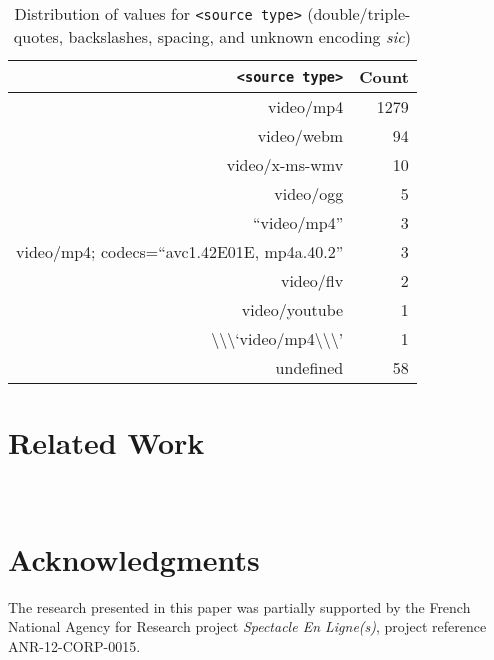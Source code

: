 \documentclass{sig-alternate}
\begin{document}
\begin{table}[p]
  \centering
  \begin{tabular}{ r | r }
    \texttt{<source type>} & Count \\
    \hline
    video/mp4 & 1279\\
    video/webm & 94\\
    video/x-ms-wmv & 10\\    
    video/ogg & 5\\    
    ``video/mp4'' & 3\\    
    video/mp4; codecs=``avc1.42E01E, mp4a.40.2'' & 3\\
    video/flv & 2\\
    video/youtube & 1\\    
    \textbackslash\textbackslash\textbackslash`video/mp4\textbackslash\textbackslash\textbackslash' & 1\\
    undefined & 58\\  
  \end{tabular}
  \caption{Distribution of values for
    \texttt{<source type>}  \tiny
    (double/triple-quotes,
    backslashes, spacing, and unknown encoding
    \emph{sic})}
  \label{table:type}    
\end{table}

\section{Related Work}

~\cite{yi2012synote}

\section*{Acknowledgments}
\footnotesize
The research presented in this paper was partially supported
by the French National Agency for Research  project
\emph{Spectacle En Ligne(s)}, project reference
\mbox{ANR-12-CORP-0015}.

\normalsize


\end{document}

